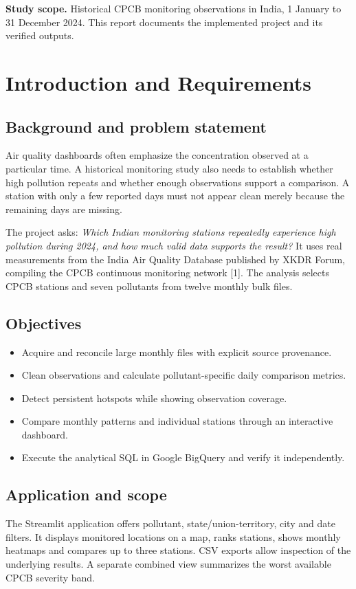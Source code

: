 \documentclass[11pt,a4paper]{article}
\begin{document}
\setcounter{tocdepth}{1}
\tableofcontents
\vspace{15mm}
\textbf{Study scope.} Historical CPCB monitoring observations in India, 1 January to 31 December 2024. This report documents the implemented project and its verified outputs.

\newpage
\section{Introduction and Requirements}
\subsection{Background and problem statement}
Air quality dashboards often emphasize the concentration observed at a particular time. A historical monitoring study also needs to establish whether high pollution repeats and whether enough observations support a comparison. A station with only a few reported days must not appear clean merely because the remaining days are missing.

The project asks: \emph{Which Indian monitoring stations repeatedly experience high pollution during 2024, and how much valid data supports the result?} It uses real measurements from the India Air Quality Database published by XKDR Forum, compiling the CPCB continuous monitoring network [1]. The analysis selects CPCB stations and seven pollutants from twelve monthly bulk files.

\subsection{Objectives}
\begin{itemize}
\item Acquire and reconcile large monthly files with explicit source provenance.
\item Clean observations and calculate pollutant-specific daily comparison metrics.
\item Detect persistent hotspots while showing observation coverage.
\item Compare monthly patterns and individual stations through an interactive dashboard.
\item Execute the analytical SQL in Google BigQuery and verify it independently.
\end{itemize}

\subsection{Application and scope}
The Streamlit application offers pollutant, state/union-territory, city and date filters. It displays monitored locations on a map, ranks stations, shows monthly heatmaps and compares up to three stations. CSV exports allow inspection of the underlying results. A separate combined view summarizes the worst available CPCB severity band.
\end{document}
